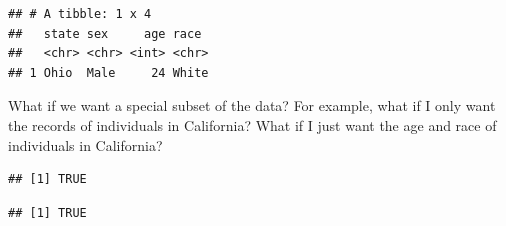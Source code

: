 \documentclass[]{book}
\newenvironment{Shaded}{\begin{snugshade}}{\end{snugshade}}
\newcommand{\CommentTok}[1]{\textcolor[rgb]{0.56,0.35,0.01}{\textit{#1}}}
\newcommand{\KeywordTok}[1]{\textcolor[rgb]{0.13,0.29,0.53}{\textbf{#1}}}
\newcommand{\NormalTok}[1]{#1}
\newcommand{\OperatorTok}[1]{\textcolor[rgb]{0.81,0.36,0.00}{\textbf{#1}}}
\newcommand{\StringTok}[1]{\textcolor[rgb]{0.31,0.60,0.02}{#1}}
\theoremstyle{definition}
\theoremstyle{definition}
\theoremstyle{definition}
\theoremstyle{remark}
\begin{document}
\begin{verbatim}
## # A tibble: 1 x 4
##   state sex     age race 
##   <chr> <chr> <int> <chr>
## 1 Ohio  Male     24 White
\end{verbatim}

What if we want a special subset of the data? For example, what if I only want the records of individuals in California? What if I just want the age and race of individuals in California?

\begin{Shaded}
\end{Shaded}

\begin{verbatim}
## [1] TRUE
\end{verbatim}

\begin{Shaded}
\end{Shaded}

\begin{verbatim}
## [1] TRUE
\end{verbatim}
\end{document}
